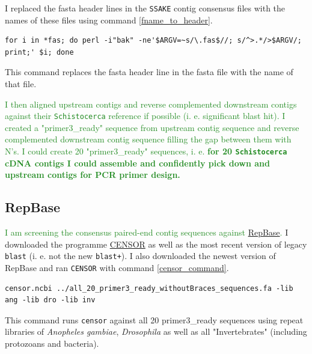 \documentclass{article}\usepackage[]{graphicx}\usepackage[]{color}
\newcommand{\roger}[1]{ \textcolor[named]{ForestGreen}{#1} }
\begin{document}
I replaced the fasta header lines in the \texttt{SSAKE} contig consensus files with the names of these files using command \ref{fname_to_header}.

\begin{command}
\captionsetup{type=command}
\begin{Verbatim}
for i in *fas; do perl -i"bak" -ne'$ARGV=~s/\.fas$//; s/^>.*/>$ARGV/; print;' $i; done
\end{Verbatim}
\caption{This command replaces the fasta header line in the fasta file with the name of that file.}
\label{fname_to_header}
\end{command}

\roger{I then aligned upstream contigs and reverse complemented downstream contigs against their \texttt{Schistocerca} reference if possible (i. e. significant blast hit). I created a "primer3\_ready" sequence from upstream contig sequence and reverse complemented downstream contig sequence filling the gap between them with N's. I could create 20 "primer3\_ready" sequences, i. e. \textbf{for 20 \texttt{Schistocerca} cDNA contigs I could assemble and confidently pick down and upstream contigs for PCR primer design.} } 

\subsection{RepBase}

\roger{I am screening the consensus paired-end contig sequences against \href{http://www.girinst.org/server/RepBase/index.php}{RepBase}. } I downloaded the programme \href{http://www.girinst.org/downloads/software/censor/}{CENSOR} as well as the most recent version of legacy \texttt{blast} (i. e. not the new \texttt{blast+}). I also downloaded the newest version of RepBase and ran \texttt{CENSOR} with command \ref{censor_command}.

\begin{command}
\captionsetup{type=command}
\begin{Verbatim}
censor.ncbi ../all_20_primer3_ready_withoutBraces_sequences.fa -lib ang -lib dro -lib inv
\end{Verbatim}
\caption{This command runs \texttt{censor} against all 20 primer3\_ready sequences using repeat libraries of \textit{Anopheles gambiae}, \textit{Drosophila} as well as all "Invertebrates" (including protozoans and bacteria).}
\label{censor_command}
\end{command}
\end{document}
